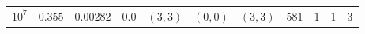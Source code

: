\begin{tabular}{l c c c c c c c c c c}
$10^7$  &  $0.355$  &  $0.00282$  &  $0.0$  &  $(3, 3)$  &  $(0, 0)$  &  $(3, 3)$  &  $581$  &  $1$  &  $1$  &  $3$\\ 

\end{tabular}
